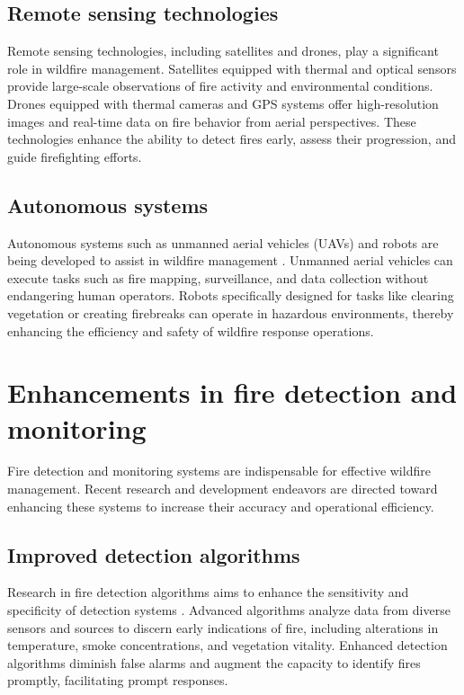 \documentclass[
  12 pt,
]{Nemilov}
\begin{document}
\subsection{Remote sensing technologies}\label{remote-sensing-technologies}

Remote sensing technologies, including satellites and drones, play a significant role in wildfire management. Satellites equipped with thermal and optical sensors provide large-scale observations of fire activity and environmental conditions. Drones equipped with thermal cameras and GPS systems offer high-resolution images and real-time data on fire behavior from aerial perspectives. These technologies enhance the ability to detect fires early, assess their progression, and guide firefighting efforts.

\subsection{Autonomous systems}\label{autonomous-systems}

Autonomous systems such as unmanned aerial vehicles (UAVs) and robots are being developed to assist in wildfire management \citep{couceiro2019semfire, ferreira2020autonomous}. Unmanned aerial vehicles can execute tasks such as fire mapping, surveillance, and data collection without endangering human operators. Robots specifically designed for tasks like clearing vegetation or creating firebreaks can operate in hazardous environments, thereby enhancing the efficiency and safety of wildfire response operations.

\section{Enhancements in fire detection and monitoring}\label{enhancements-in-fire-detection-and-monitoring}

Fire detection and monitoring systems are indispensable for effective wildfire management. Recent research and development endeavors are directed toward enhancing these systems to increase their accuracy and operational efficiency.

\subsection{Improved detection algorithms}\label{improved-detection-algorithms}

Research in fire detection algorithms aims to enhance the sensitivity and specificity of detection systems \citep{moayedi2023wildfire, pereira2022review}. Advanced algorithms analyze data from diverse sensors and sources to discern early indications of fire, including alterations in temperature, smoke concentrations, and vegetation vitality. Enhanced detection algorithms diminish false alarms and augment the capacity to identify fires promptly, facilitating prompt responses.
\end{document}
